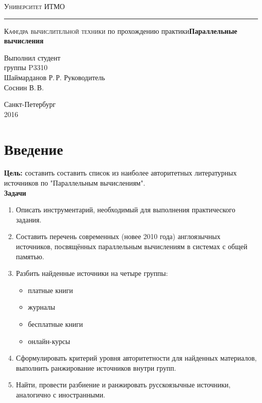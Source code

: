 \documentclass{article}
\author{Шаймарданов Р. Р.}
\begin{document}
\begin{titlepage}
	\begin{center}
		{\large\textsc{Университет ИТМО}}
		\vskip 1pt \hrule \vskip 3pt
		{\large\textsc{Кафедра вычислительной техники}}
		\vfill
		{ по прохождению практики\vskip 12pt\bfseries Параллельные вычисления}	
	\end{center}
	\vfill	
	\begin{flushright}
		{Выполнил студент\\группы P3310\\Шаймарданов Р.\,Р.\vskip 12pt Руководитель\\Соснин В.\,В.}
	\end{flushright}	
	\vfill	
	\begin{center}
		Санкт-Петербург\\2016
	\end{center}
\end{titlepage}

\tableofcontents
\newpage

\section{Введение}
	\textbf{Цель:} составить составить список из наиболее авторитетных литературных источников по "Параллельным вычислениям".\\
	
	\textbf{Задачи}
	\begin{enumerate}
		\item Описать инструментарий, необходимый для выполнения практического задания.
   		\item Составить перечень современных (новее 2010 года) англоязычных источников, посвящённых параллельным вычислениям в системах с общей памятью.
   		\item Разбить найденные источники на четыре группы: 
   			\begin{itemize}
   		   		\item платные книги 
   		   		\item журналы 
   		   		\item бесплатные книги
   		   		\item онлайн-курсы
   		   	\end{itemize}
   		\item Сформулировать критерий уровня авторитетности для найденных материалов, выполнить ранжирование источников внутри групп.
   		\item Найти, провести разбиение и ранжировать русскоязычные источники, аналогично с иностранными. 
	\end{enumerate}
\newpage
\end{document}
